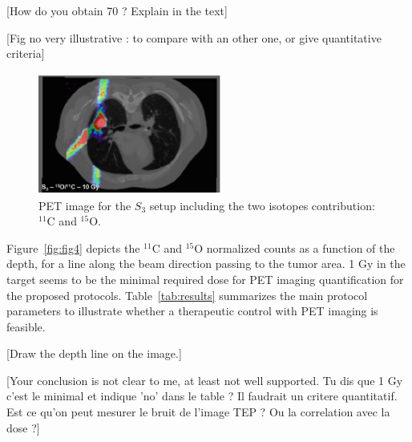 \documentclass[11pt]{iopart}
\newcommand{\dsnote}[1]{{\color{green}[#1]}}
\begin{document}
\dsnote{How do you obtain 70 ? Explain in the text}

\dsnote{Fig no very illustrative : to compare with an other one, or
  give quantitative criteria}


\begin{figure}[!htbp]
  \begin{center}
    \includegraphics[width=6cm,height=40mm]{figures/C11_O15_10Gy_v1.jpg}
    \caption{PET image for the $S_3$ setup including the two isotopes
      contribution: $^{11}$C and $^{15}$O.}
  \end{center}
  \label{fig:fig5}
\end{figure} 

Figure~\ref{fig:fig4} depicts the $^{11}$C and $^{15}$O normalized
counts as a function of the depth, for a line along the beam direction
passing to the tumor area. 1 Gy in the target seems to be the minimal
required dose for PET imaging quantification for the proposed
protocols. Table~\ref{tab:results} summarizes the main protocol
parameters to illustrate whether a therapeutic control with PET
imaging is feasible.

\dsnote{Draw the depth line on the image.}

\dsnote{Your conclusion is not clear to me, at least not well
  supported. Tu dis que 1 Gy c'est le minimal et indique 'no' dans le
  table ? Il faudrait un critere quantitatif. Est ce qu'on peut
  mesurer le bruit de l'image TEP ? Ou la correlation avec la dose ?}
\end{document}
